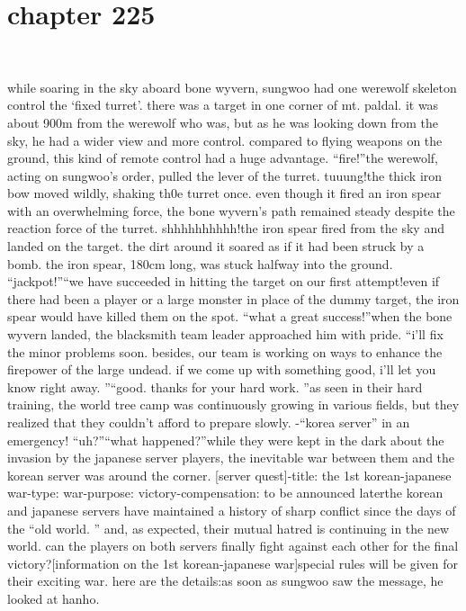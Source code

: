 \section{chapter 225}

                             




while soaring in the sky aboard bone wyvern, sungwoo had one werewolf skeleton control the ‘fixed turret’.
 there was a target in one corner of mt.
 paldal.
 it was about 900m from the werewolf who was, but as he was looking down from the sky, he had a wider view and more control.
 compared to flying weapons on the ground, this kind of remote control had a huge advantage.
“fire!”the werewolf, acting on sungwoo’s order, pulled the lever of the turret.
tuuung!the thick iron bow moved wildly, shaking th0e turret once.
 even though it fired an iron spear with an overwhelming force, the bone wyvern’s path remained steady despite the reaction force of the turret.
shhhhhhhhhh!the iron spear fired from the sky and landed on the target.
 the dirt around it soared as if it had been struck by a bomb.
 the iron spear, 180cm long, was stuck halfway into the ground.
“jackpot!”“we have succeeded in hitting the target on our first attempt!even if there had been a player or a large monster in place of the dummy target, the iron spear would have killed them on the spot.
“what a great success!”when the bone wyvern landed, the blacksmith team leader approached him with pride.
“i’ll fix the minor problems soon.
 besides, our team is working on ways to enhance the firepower of the large undead.
 if we come up with something good, i’ll let you know right away.
”“good.
 thanks for your hard work.
”as seen in their hard training, the world tree camp was continuously growing in various fields, but they realized that they couldn’t afford to prepare slowly.
-“korea server” in an emergency!
“uh?”“what happened?”while they were kept in the dark about the invasion by the japanese server players, the inevitable war between them and the korean server was around the corner.
[server quest]-title: the 1st korean-japanese war-type: war-purpose: victory-compensation: to be announced laterthe korean and japanese servers have maintained a history of sharp conflict since the days of the “old world.
” and, as expected, their mutual hatred is continuing in the new world.
 can the players on both servers finally fight against each other for the final victory?[information on the 1st korean-japanese war]special rules will be given for their exciting war.
 here are the details:as soon as sungwoo saw the message, he looked at hanho.
